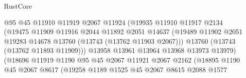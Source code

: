 \begin{lexlean}{RustCore}
\begin{coremodule}
                                      @95
                                      @45
                                      @11910
                                      @11919
                                      @2067
                                      @11924
                                      (@19935
                                        @11910
                                        @11917
                                        @2134
                                        (@19475
                                          @11909
                                          @11916
                                          @2044
                                          @11892
                                          @2051
                                          @14637
                                          (@19489
                                            @11902
                                            @2051
                                            @19283
                                            @14678
                                            @13760
                                            (@13743 (@13762 @11903 @2067)))
                                          @13760
                                          (@13743 (@13762 @11893 @11909)))
                                        @13958
                                        @13961
                                        @13964
                                        @13968
                                        @13973
                                        @13979)
                                      (@18696
                                        @11919
                                        @1190
                                        @95
                                        @45
                                        @2067
                                        @11921
                                        @2067
                                        @2162
                                        (@18895
                                          @1190
                                          @45
                                          @2067
                                          @8617
                                          (@19258
                                            @1189
                                            @1525
                                            @45
                                            @2067
                                            @8615
                                            @2088
                                            @1577

\end{coremodule}
\end{lexlean}
